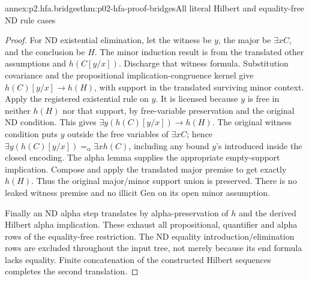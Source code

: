 \begin{annexitem}{annex:p2.hfa.bridges}{thm:p02-hfa-proof-bridges}{All literal Hilbert and equality-free ND rule cases}
\begin{proof}
For ND existential elimination, let the witness be \(y\), the major
be \(\exists xC\), and the conclusion be \(H\).
The minor induction result is from the translated other assumptions
and \(h(C[y/x])\). Discharge that witness formula. Substitution
covariance and the propositional implication-congruence kernel give
\(h(C)[y/x]\to h(H)\), with support in the translated surviving
minor context. Apply the registered existential rule on \(y\).
It is licensed because \(y\) is free in neither \(h(H)\) nor
that support, by free-variable preservation and the original ND
condition. This gives
\(\exists y(h(C)[y/x])\to h(H)\).
The original witness condition puts \(y\) outside the free variables
of \(\exists xC\); hence
\(\exists y(h(C)[y/x])=_{\alpha}\exists xh(C)\), including
any bound \(y\)'s introduced inside the closed encoding. The alpha
lemma supplies the appropriate empty-support implication. Compose
and apply the translated major premise to get exactly \(h(H)\).
Thus the original major/minor support union is preserved. There is
no leaked witness premise and no illicit Gen on its open minor
assumption.

Finally an ND alpha step translates by alpha-preservation of \(h\)
and the derived Hilbert alpha implication. These exhaust all
propositional, quantifier and alpha rows of the equality-free restriction.
The ND equality introduction/elimination rows are excluded throughout
the input tree, not merely because its end formula lacks equality.
Finite concatenation of the constructed Hilbert sequences completes
the second translation.
\end{proof}
\end{annexitem}

